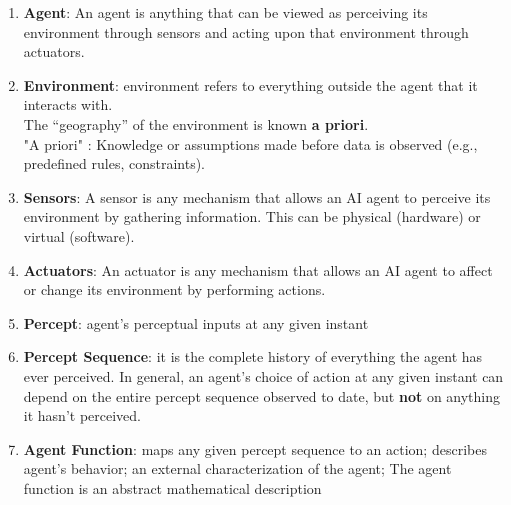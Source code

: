 \begin{enumerate}[itemsep=0.2cm]
    \item \textbf{Agent}: An agent is anything that can be viewed as perceiving its environment through sensors and acting upon that environment through actuators.
    \hfill \cite{ai/book/Artificial-Intelligence-A-Modern-Approach/Russell-Norvig}

    \item \textbf{Environment}: environment refers to everything outside the agent that it interacts with.
    \hfill \cite{common/online/chatgpt}
    \\
    The “geography” of the environment is known \textbf{a priori}.
    \hfill \cite{ai/book/Artificial-Intelligence-A-Modern-Approach/Russell-Norvig}
    \\
    "A priori" : Knowledge or assumptions made before data is observed (e.g., predefined rules, constraints).
    \hfill \cite{common/online/chatgpt}

    \item \textbf{Sensors}: A sensor is any mechanism that allows an AI agent to perceive its environment by gathering information. This can be physical (hardware) or virtual (software).
    \hfill \cite{common/online/chatgpt}

    \item \textbf{Actuators}: An actuator is any mechanism that allows an AI agent to affect or change its environment by performing actions.
    \hfill \cite{common/online/chatgpt}

    \item \textbf{Percept}: agent’s perceptual inputs at any given instant
    \hfill \cite{ai/book/Artificial-Intelligence-A-Modern-Approach/Russell-Norvig}
    
    \item \textbf{Percept Sequence}: it is the complete history of everything the agent has ever perceived. In general, an agent’s choice of action at any given instant can depend on the entire percept sequence observed to date, but \textbf{not} on anything it hasn’t perceived.
    \hfill \cite{ai/book/Artificial-Intelligence-A-Modern-Approach/Russell-Norvig}

    \item \textbf{Agent Function}: maps any given percept sequence to an action; describes agent’s behavior; an external characterization of the agent; The agent function is an abstract mathematical description
    \hfill \cite{ai/book/Artificial-Intelligence-A-Modern-Approach/Russell-Norvig}


\end{enumerate}
